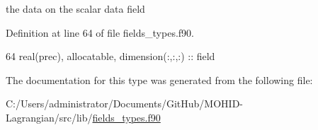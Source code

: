 the data on the scalar data field 



Definition at line 64 of file fields\+\_\+types.\+f90.


\begin{DoxyCode}
64         \textcolor{keywordtype}{real(prec)}, \textcolor{keywordtype}{allocatable}, \textcolor{keywordtype}{dimension(:,:,:)} :: field
\end{DoxyCode}


The documentation for this type was generated from the following file\+:\begin{DoxyCompactItemize}
\item 
C\+:/\+Users/administrator/\+Documents/\+Git\+Hub/\+M\+O\+H\+I\+D-\/\+Lagrangian/src/lib/\mbox{\hyperlink{fields__types_8f90}{fields\+\_\+types.\+f90}}\end{DoxyCompactItemize}

